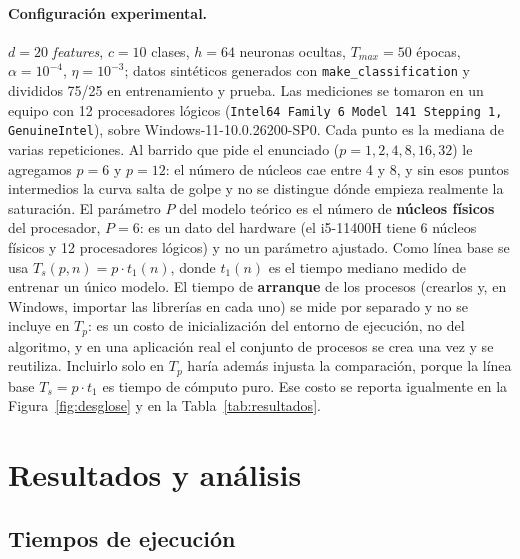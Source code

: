 \documentclass[11pt,a4paper]{article}
\begin{document}
\paragraph{Configuración experimental.} $d = 20$ \emph{features}, $c = 10$ clases, $h = 64$ neuronas ocultas, $T_{max} = 50$ épocas, $\alpha = 10^{-4}$, $\eta = 10^{-3}$; datos sintéticos generados con \texttt{make\_classification} y divididos 75/25 en entrenamiento y prueba. Las mediciones se tomaron en un equipo con 12 procesadores lógicos (\texttt{Intel64 Family 6 Model 141 Stepping 1, GenuineIntel}), sobre Windows-11-10.0.26200-SP0. Cada punto es la mediana de varias repeticiones. Al barrido que pide el enunciado ($p = 1,2,4,8,16,32$) le agregamos $p = 6$ y $p = 12$: el número de núcleos cae entre 4 y 8, y sin esos puntos intermedios la curva salta de golpe y no se distingue dónde empieza realmente la saturación. El parámetro $P$ del modelo teórico es el número de \textbf{núcleos físicos} del procesador, $P = 6$: es un dato del hardware (el i5-11400H tiene 6 núcleos físicos y 12 procesadores lógicos) y no un parámetro ajustado. Como línea base se usa $T_s(p,n) = p\cdot t_1(n)$, donde $t_1(n)$ es el tiempo mediano medido de entrenar un único modelo. El tiempo de \textbf{arranque} de los procesos (crearlos y, en
Windows, importar las librerías en cada uno) se mide por separado y no se incluye en $T_p$: es un
costo de inicialización del entorno de ejecución, no del algoritmo, y en una aplicación real el
conjunto de procesos se crea una vez y se reutiliza. Incluirlo solo en $T_p$ haría además injusta la
comparación, porque la línea base $T_s = p\cdot t_1$ es tiempo de cómputo puro. Ese costo se reporta
igualmente en la Figura~\ref{fig:desglose} y en la Tabla~\ref{tab:resultados}.

\section{Resultados y análisis}

\subsection{Tiempos de ejecución}
\end{document}
